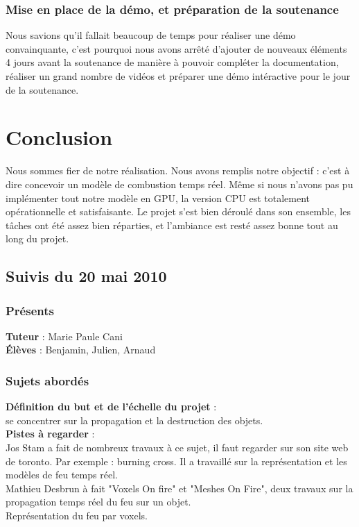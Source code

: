 \documentclass[a4paper,10pt]{article}
\begin{document}
\subsubsection{Mise en place de la démo, et préparation de la soutenance}
Nous savions qu'il fallait beaucoup de temps pour réaliser une démo convainquante,
c'est pourquoi nous avons arrêté d'ajouter de nouveaux éléments 4 jours avant la soutenance
de manière à pouvoir compléter la documentation, réaliser un grand nombre de vidéos et préparer 
une démo intéractive pour le jour de la soutenance.



\section{Conclusion}
Nous sommes fier de notre réalisation. Nous avons remplis notre objectif : c'est à 
dire concevoir un modèle de combustion temps réel. Même si nous n'avons pas 
pu implémenter tout notre modèle en GPU, la version CPU est totalement
opérationnelle et satisfaisante. Le projet s'est bien déroulé dans son ensemble,
les tâches ont été assez bien réparties, et l'ambiance est resté assez bonne tout au 
long du projet.



\subsection{Suivis du  20 mai 2010}

\subsubsection{Présents}
\textbf{Tuteur} : Marie Paule Cani \\
\textbf{Élèves} : Benjamin, Julien, Arnaud \\

\subsubsection{Sujets abordés}
\textbf{Définition du but et de l'échelle du projet} :  \\
se concentrer sur la propagation et la destruction des objets.\\

\textbf{Pistes à regarder} : \\
Jos Stam a fait de nombreux travaux à ce sujet, il faut regarder sur son site web de toronto. Par exemple : burning cross. Il a travaillé sur la représentation et  les modèles de feu temps réel.\\
Mathieu Desbrun à fait "Voxels On fire" et "Meshes On Fire", deux travaux sur la propagation temps réel du feu sur un objet.\\
Représentation du feu par voxels.\\
\end{document}
